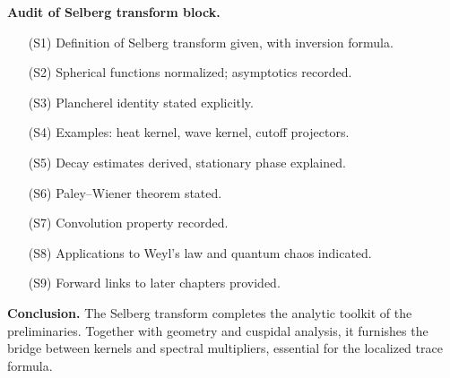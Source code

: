 \noindent\textbf{Audit of Selberg transform block.}
\begin{itemize}
  \item[(S1)] Definition of Selberg transform given, with inversion formula.
  \item[(S2)] Spherical functions normalized; asymptotics recorded.
  \item[(S3)] Plancherel identity stated explicitly.
  \item[(S4)] Examples: heat kernel, wave kernel, cutoff projectors.
  \item[(S5)] Decay estimates derived, stationary phase explained.
  \item[(S6)] Paley–Wiener theorem stated.
  \item[(S7)] Convolution property recorded.
  \item[(S8)] Applications to Weyl’s law and quantum chaos indicated.
  \item[(S9)] Forward links to later chapters provided.
\end{itemize}

\medskip

\noindent\textbf{Conclusion.}
The Selberg transform completes the analytic toolkit of the preliminaries.
Together with geometry and cuspidal analysis,
it furnishes the bridge between kernels and spectral multipliers,
essential for the localized trace formula.

